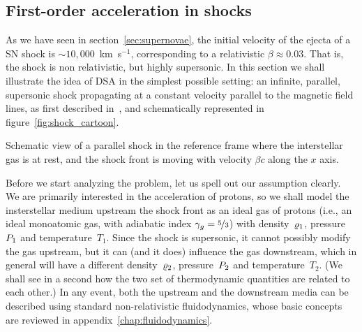\subsection{First-order acceleration in shocks}\label{sec:shock_acceleration}

As we have seen in section~\ref{sec:supernovae}, the initial velocity of the ejecta
of a SN shock is $\sim 10,000$~km~s$^{-1}$, corresponding to a relativistic
$\beta \approx 0.03$. That is, the shock is non relativistic, but highly
supersonic.
In this section we shall illustrate the idea of DSA in the simplest possible setting:
an infinite, parallel, supersonic shock propagating at a constant velocity parallel
to the magnetic field lines, as first described in~\cite{1978MNRAS.182..147B},
and schematically represented in figure~\ref{fig:shock_cartoon}.

\begin{marginfigure}
  
  \caption{Schematic view of a parallel shock in the reference frame where the
  interstellar gas is at rest, and the shock front is moving with velocity $\beta c$
  along the $x$ axis.}
  \label{fig:shock_cartoon}
\end{marginfigure}

Before we start analyzing the problem, let us spell out our assumption clearly.
We are primarily interested in the acceleration of protons, so we shall model
the insterstellar medium upstream the shock front as an ideal gas of protons
(i.e., an ideal monoatomic gas, with adiabatic index $\gamma_g = \nicefrac{5}{3}$)
with density~$\varrho_1$, pressure~$P_1$ and temperature~$T_1$. Since
the shock is supersonic, it cannot possibly modify the gas upstream, but it can
(and it does) influence the gas downstream, which in general will have a different
density~$\varrho_2$, pressure~$P_2$ and temperature~$T_2$. (We shall see
in a second how the two set of thermodynamic quantities are related to each other.)
In any event, both the upstream and the downstream media can be described using
standard non-relativistic fluidodynamics, whose basic concepts are reviewed in
appendix~\ref{chap:fluidodynamics}.

